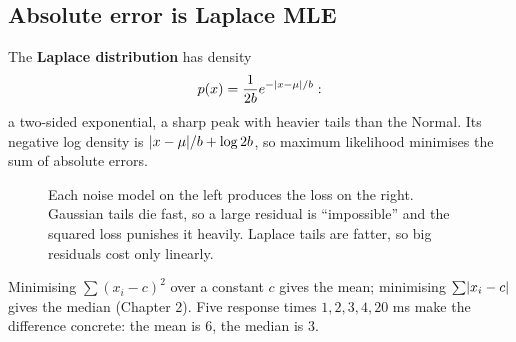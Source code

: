 \subsection{Absolute error is Laplace MLE}

The \textbf{Laplace distribution} has density
\[
  p(x) = \frac{1}{2b}e^{-\lvert x-\mu\rvert/b} :
\]
a two-sided exponential, a sharp peak with heavier tails than the Normal. Its negative log density is $\lvert x-\mu\rvert/b + \log 2b$, so maximum likelihood minimises the sum of absolute errors.

\begin{figure}[H]
\centering
{}
\caption{Each noise model on the left produces the loss on the right. Gaussian tails
die fast, so a large residual is ``impossible'' and the squared loss punishes it
heavily. Laplace tails are fatter, so big residuals cost only linearly.}
\label{fig:lik-noise-loss}
\end{figure}

Minimising $\sum(x_i-c)^2$ over a constant $c$ gives the mean; minimising
$\sum\lvert x_i-c\rvert$ gives the median (Chapter 2). Five response times
$1,2,3,4,20$ ms make the difference concrete: the mean is $6$, the median is $3$.

